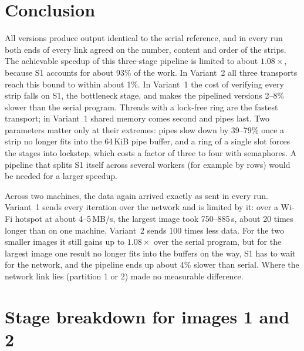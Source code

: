\documentclass[11pt,a4paper]{article}
\begin{document}
\section{Conclusion}
All versions produce output identical to the serial reference, and in every run both ends of
every link agreed on the number, content and order of the strips. The achievable speedup of
this three-stage pipeline is limited to about $1.08\times$, because S1 accounts for about 93\% of
the work. In Variant~2 all three transports reach this bound to within about 1\%. In Variant~1
the cost of verifying every strip falls on S1, the bottleneck stage, and makes the pipelined
versions 2--8\% slower than the serial program. Threads with a lock-free ring are the fastest
transport; in Variant~1 shared memory comes second and pipes last. Two parameters matter only at
their extremes: pipes slow down by 39--79\% once a strip no longer fits into the 64\,KiB pipe
buffer, and a ring of a single slot forces the stages into lockstep, which costs a factor of three
to four with semaphores. A pipeline that splits S1 itself across several workers (for example
by rows) would be needed for a larger speedup.

Across two machines, the data again arrived exactly as sent in every run. Variant~1 sends every
iteration over the network and is limited by it: over a Wi-Fi hotspot at about 4--5\,MB/s, the
largest image took 750--885\,s, about 20 times longer than on one machine. Variant~2 sends
100 times less data. For the two smaller images it still gains up to $1.08\times$ over the serial
program, but for the largest image one result no longer fits into the buffers on the way, S1 has
to wait for the network, and the pipeline ends up about 4\% slower than serial. Where the network
link lies (partition 1 or 2) made no measurable difference.

\clearpage
\appendix
\section{Stage breakdown for images 1 and 2}
\label{app:stages}
\end{document}
